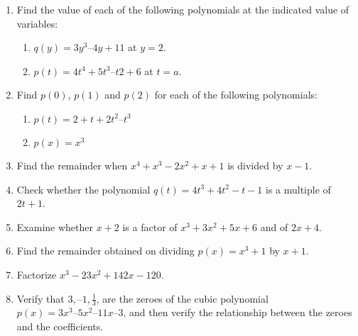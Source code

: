 \renewcommand{\theequation}{\theenumi}
\begin{enumerate}[label=\arabic*.,ref=\thesubsection.\theenumi]
%
\item Find the value of each of the following polynomials at the indicated value of variables: 
\begin{enumerate}
\item  $q(y) = 3y^3 – 4y + 11$ at $y = 2. $
\item  $p(t) = 4t^4+ 5t^3 – t2 + 6$ at $t = a.$
\end{enumerate}
%
\item Find $p(0)$, $p(1)$ and $p(2)$ for each of the following polynomials: 
\begin{enumerate}
\item  $p(t) = 2 + t + 2t^2 – t^3 $
\item $ p(x) = x^3$
\end{enumerate}
%
\item Find the remainder when $x^4+x^3-2x^2+x+1$ is divided by $x-1$.
%
\item Check whether the polynomial $q(t) = 4t^3+4t^2-t-1$ is a multiple of $2t+1$.
\item Examine whether $x + 2$ is a factor of $x^3 + 3x^2 + 5x + 6$ and of $2x + 4$.
\item Find the remainder obtained on dividing $p(x) = x^3+1 $ by $x+1$.
\item Factorize $x^3 - 23x^2 + 142x -120$.
\item Verify that $3, –1, \frac{1}{ 3}$, are the zeroes of the cubic polynomial $p(x) = 3x^3 – 5x^2 – 11x – 3$, and then verify the relationship between the zeroes and the coefficients.
\end{enumerate}
